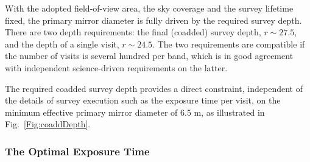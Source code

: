 With the adopted field-of-view area, the sky coverage and the survey lifetime
fixed, the primary mirror diameter is fully driven by the required survey
depth. There are two depth requirements: the final (coadded) survey depth,
$r\sim27.5$, and the depth of a single visit, $r\sim24.5$. The two
requirements are compatible if the number of visits is several hundred
per band, which is in good agreement with independent science-driven
requirements on the latter.

The required coadded survey depth provides a direct constraint,
independent of the details of survey execution such as the exposure time per visit,
on the minimum effective primary mirror diameter of 6.5 m, as illustrated in
Fig.~\ref{Fig:coaddDepth}.



\subsubsection{ The Optimal Exposure Time }

